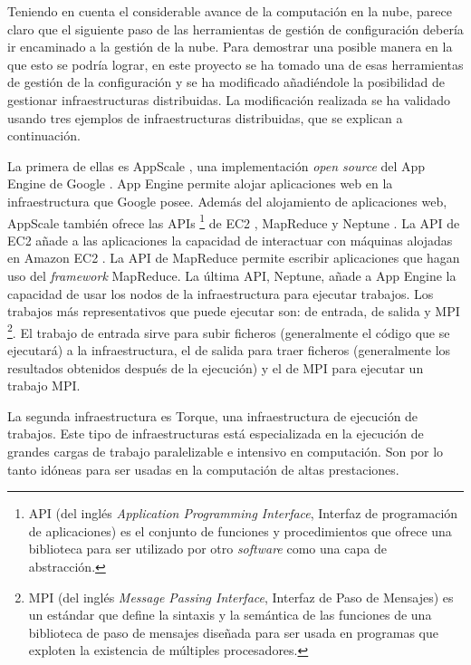 Teniendo en cuenta el considerable avance de la computación en la nube, parece claro que el siguiente paso de las herramientas de gestión de configuración debería ir encaminado a la gestión de la nube. Para demostrar una posible manera en la que esto se podría lograr, en este proyecto se ha tomado una de esas herramientas de gestión de la configuración y se ha modificado añadiéndole la posibilidad de gestionar infraestructuras distribuidas. La modificación realizada se ha validado usando tres ejemplos de infraestructuras distribuidas, que se explican a continuación.

La primera de ellas es AppScale \cite{appscale}, una implementación \emph{open source} del App Engine de Google \cite{appengine}. App Engine permite alojar aplicaciones web en la infraestructura que Google posee. Además del alojamiento de aplicaciones web, AppScale también ofrece las APIs \footnote[1]{API (del inglés \emph{Application Programming Interface}, Interfaz de programación de aplicaciones) es el conjunto de funciones y procedimientos que ofrece una biblioteca para ser utilizado por otro \emph{software} como una capa de abstracción.} de EC2 \cite{appscale-ec2}, MapReduce \cite{appscale-mapreduce} y Neptune \cite{appscale-neptune}. La API de EC2 añade a las aplicaciones la capacidad de interactuar con máquinas alojadas en Amazon EC2 \cite{amazon-ec2}. La API de MapReduce permite escribir aplicaciones que hagan uso del \emph{framework} MapReduce. La última API, Neptune, añade a App Engine la capacidad de usar los nodos de la infraestructura para ejecutar trabajos. Los trabajos más representativos que puede ejecutar son: de entrada, de salida y MPI \footnote[2]{MPI (del inglés \emph{Message Passing Interface}, Interfaz de Paso de Mensajes) es un estándar que define la sintaxis y la semántica de las funciones de una biblioteca de paso de mensajes diseñada para ser usada en programas que exploten la existencia de múltiples procesadores.}. El trabajo de entrada sirve para subir ficheros (generalmente el código que se ejecutará) a la infraestructura, el de salida para traer ficheros (generalmente los resultados obtenidos después de la ejecución) y el de MPI para ejecutar un trabajo MPI.

La segunda infraestructura es Torque, una infraestructura de ejecución de trabajos. Este tipo de infraestructuras está especializada en la ejecución de grandes cargas de trabajo paralelizable e intensivo en computación. Son por lo tanto idóneas para ser usadas en la computación de altas prestaciones.

